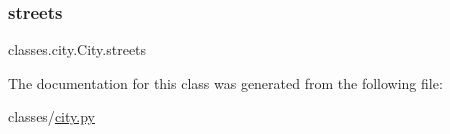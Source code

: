 \mbox{\label{classclasses_1_1city_1_1City_a4d48dd3da02a31109eaf40614b93640d}} 
\subsubsection{\texorpdfstring{streets}{streets}}
{\footnotesize\ttfamily classes.\+city.\+City.\+streets}



The documentation for this class was generated from the following file\+:\begin{DoxyCompactItemize}
\item 
classes/\hyperlink{city_8py}{city.\+py}\end{DoxyCompactItemize}
